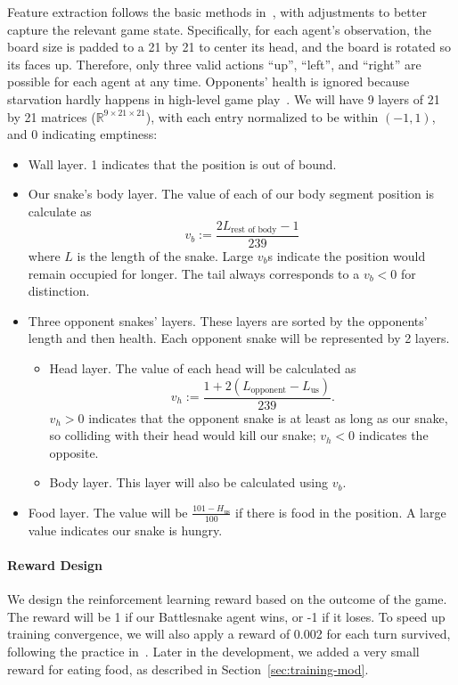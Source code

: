 \documentclass[conference]{IEEEtran}
\begin{document}
Feature extraction follows the basic methods
in~\cite{siddiqui2020multiagent,archinukmonte},
with adjustments to better capture the relevant game state. Specifically,
for each agent's observation,
the board size is padded to a 21 by 21 to center its head,
and the board is rotated so its faces up. Therefore,
only three valid actions ``up'', ``left'',
and ``right'' are possible for each agent at any time.
Opponents' health is ignored because starvation hardly happens in high-level
game play~\cite{siddiqui2020multiagent}.
We will have 9 layers of 21 by 21 matrices ($\mathbb R^{9\times21\times21}$),
with each entry normalized to be within $(-1,1)$, and 0 indicating emptiness:
\begin{itemize}
    \item Wall layer. 1 indicates that the position is out of bound.
    \item Our snake's body layer.
    The value of each of our body segment position is calculate as $$
        v_b:=\frac{2L_{\text{rest of body}}-1}{239}
    $$ where $L$ is the length of the snake.
    Large $v_b$s indicate the position would remain occupied for longer.
    The tail always corresponds to a $v_b<0$ for distinction.
    \item Three opponent snakes' layers.
    These layers are sorted by the opponents' length and then health.
    Each opponent snake will be represented by 2 layers. \begin{itemize}
        \item Head layer. The value of each head will be calculated as $$
            v_h:=\frac{1+2(L_{\text{opponent}}-L_{\text{us}})}{239}.
        $$ $v_h>0$ indicates that the opponent snake is at least as
        long as our snake,
        so colliding with their head would kill our snake;
        $v_h<0$ indicates the opposite.
        \item Body layer. This layer will also be calculated using $v_b$.
    \end{itemize}
    \item Food layer.
    The value will be $\displaystyle\frac{101-H_{\text{us}}}{100}$ if
    there is food in the position.
    A large value indicates our snake is hungry.
\end{itemize}

\paragraph{Reward Design}
We design the reinforcement learning reward based on the outcome of the game.
The reward will be 1 if our Battlesnake agent wins, or -1 if it loses.
To speed up training convergence,
we will also apply a reward of 0.002 for each turn survived,
following the practice in~\cite{chung2020battlesnake}.
Later in the development, we added a very small reward for eating food,
as described in Section~\ref{sec:training-mod}.
\end{document}
